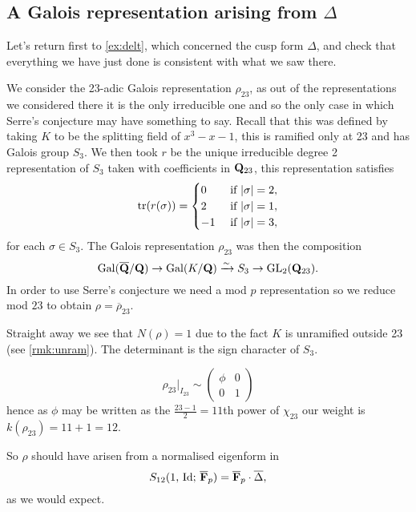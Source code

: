 \documentclass[a4paper,12pt]{article}
\begin{document}
\subsection{A Galois representation arising from $\Delta$}
Let's return first to \cref{ex:delt}, which concerned the cusp form $\Delta$, and check that everything we have just done is consistent with what we saw there.

\begin{ex}
We consider the 23-adic Galois representation $\rho_{23}$, as out of the representations we considered there it is the only irreducible one and so the only case in which Serre's conjecture may have something to say.
Recall that this was defined by taking $K$ to be the splitting field of $x^3 - x - 1$, this is ramified only at 23 and has Galois group $S_3$.
We then took $r$ be the unique irreducible degree 2 representation of $S_3$ taken with coefficients in $\mathbf{Q}_{23}$, this representation satisfies
\[
\operatorname{tr}(r(\sigma)) = \begin{cases}
0 &\text{ if } |\sigma| = 2,\\
2 &\text{ if } |\sigma| = 1,\\
-1 &\text{ if } |\sigma| = 3,
\end{cases}
\]
for each $\sigma \in S_3$.
The Galois representation $\rho_{23}$ was then the composition
\[
\operatorname{Gal}(\overline{\mathbf{Q}}/\mathbf{Q}) \to \operatorname{Gal}(K/\mathbf{Q}) \xrightarrow{\sim} S_3 \to \operatorname{GL}_2(\mathbf{Q}_{23}).
\]
In order to use Serre's conjecture we need a mod $p$ representation so we reduce mod $23$ to obtain $\rho = \overline{\rho}_{23}$.

Straight away we see that $N(\rho) = 1$ due to the fact $K$ is unramified outside 23 (see \cref{rmk:unram}).
The determinant is the sign character of $S_3$.

\[
\rho_{23}|_{I_{23}} \sim
\begin{pmatrix}
\phi & 0 \\
0    & 1 \end{pmatrix}
\]
hence as $\phi$ may be written as the $\frac{23-1}{2}=11$th power of $\chi_{23}$ our weight is $k(\rho_{23}) =11 + 1 = 12$.

So $\rho$ should have arisen from a normalised eigenform in
\[
S_{12}(1,\,\mathrm{Id};\,\overline{\mathbf{F}}_p) = \overline{\mathbf{F}}_p\cdot \overline{\Delta},
\]
as we would expect.
\end{ex}
\end{document}
